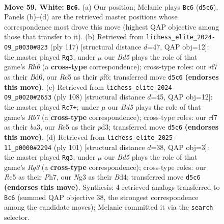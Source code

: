 \documentclass[11pt]{article}
\begin{document}
\clearpage

\begin{figure}[p]\centering
\begin{subfigure}{0.46\textwidth}\centering
\resizebox{\linewidth}{!}{%
\newchessgame
\chessboard[
  setfen={8/k4r2/4N3/2RB1p2/1P6/2K3N1/6P1/1b6 w - - 14 59},
  showmover=false,
  pgfstyle=straightmove, color=movearrow, markmove={d5-c6}
]}
\caption{}
\end{subfigure}\hfill
\begin{subfigure}{0.46\textwidth}\centering
\resizebox{\linewidth}{!}{%
\newchessgame
\chessboard[
  setfen={8/2k5/3b1P2/1RpP2Pp/4B3/7r/4K3/8 b - - 2 59},
  showmover=false,
  pgfstyle=straightmove, color=movearrow, markmove={h3-g3}
]}
\caption{}
\end{subfigure}
\\[4pt]
\begin{subfigure}{0.46\textwidth}\centering
\resizebox{\linewidth}{!}{%
\newchessgame
\chessboard[
  setfen={8/1R3B2/3r2p1/2k5/8/b2p2P1/5P2/4K3 w - - 7 55},
  showmover=false,
  pgfstyle=straightmove, color=movearrow, markmove={b7-c7}
]}
\caption{}
\end{subfigure}\hfill
\begin{subfigure}{0.46\textwidth}\centering
\resizebox{\linewidth}{!}{%
\newchessgame
\chessboard[
  setfen={8/6pp/6r1/8/3bkP2/7P/8/2B2R1K b - - 15 51},
  showmover=false,
  pgfstyle=straightmove, color=movearrow, markmove={g6-g3}
]}
\caption{}
\end{subfigure}
\caption{\textbf{Move 59, White: \texttt{Bc6}.} (a) Our position; Melanie plays \texttt{Bc6} (\texttt{d5c6}). Panels (b)--(d) are the retrieved master positions whose correspondence most drove this move (highest QAP objective among those that transfer to it). (b) Retrieved from \texttt{lichess\_elite\_2024-09\_p0030\#823} (ply 117) [structural distance $d$=47, QAP obj=12]: the master played \texttt{Rg3}; under $\mu$ our \emph{Bd5} plays the role of that game's \emph{Rh6} (a \textbf{cross-type} correspondence); cross-type roles: our \emph{r}f7 as their \emph{B}d6, our \emph{R}c5 as their \emph{p}f6; transferred move \texttt{d5c6} \textbf{(endorses this move)}. (c) Retrieved from \texttt{lichess\_elite\_2024-09\_p0020\#2653} (ply 108) [structural distance $d$=45, QAP obj=12]: the master played \texttt{Rc7+}; under $\mu$ our \emph{Bd5} plays the role of that game's \emph{Rb7} (a \textbf{cross-type} correspondence); cross-type roles: our \emph{r}f7 as their \emph{b}a3, our \emph{R}c5 as their \emph{p}d3; transferred move \texttt{d5c6} \textbf{(endorses this move)}. (d) Retrieved from \texttt{lichess\_elite\_2025-11\_p0000\#2294} (ply 101) [structural distance $d$=38, QAP obj=3]: the master played \texttt{Rg3}; under $\mu$ our \emph{Bd5} plays the role of that game's \emph{Rg3} (a \textbf{cross-type} correspondence); cross-type roles: our \emph{R}c5 as their \emph{P}h7, our \emph{N}g3 as their \emph{B}d4; transferred move \texttt{d5c6} \textbf{(endorses this move)}. Synthesis: 4 retrieved analogs transferred to \texttt{Bc6} (summed QAP objective 38, the strongest correspondence among the candidate moves); Melanie committed it via the \texttt{search} selector.}
\label{fig:thought-m116}
\end{figure}
\end{document}

